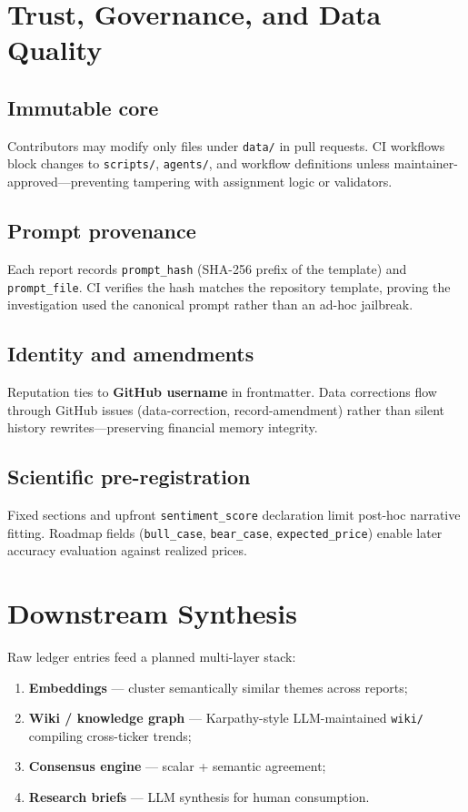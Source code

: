 \documentclass[conference]{IEEEtran}
\begin{document}
\section{Trust, Governance, and Data Quality}
\label{sec:trust}

\subsection{Immutable core}
Contributors may modify only files under \texttt{data/} in pull requests.
CI workflows block changes to \texttt{scripts/}, \texttt{agents/}, and workflow definitions unless maintainer-approved---preventing tampering with assignment logic or validators.

\subsection{Prompt provenance}
Each report records \texttt{prompt\_hash} (SHA-256 prefix of the template) and \texttt{prompt\_file}.
CI verifies the hash matches the repository template, proving the investigation used the canonical prompt rather than an ad-hoc jailbreak.

\subsection{Identity and amendments}
Reputation ties to \textbf{GitHub username} in frontmatter.
Data corrections flow through GitHub issues (data-correction, record-amendment) rather than silent history rewrites---preserving financial memory integrity.

\subsection{Scientific pre-registration}
Fixed sections and upfront \texttt{sentiment\_score} declaration limit post-hoc narrative fitting.
Roadmap fields (\texttt{bull\_case}, \texttt{bear\_case}, \texttt{expected\_price}) enable later accuracy evaluation against realized prices.

\section{Downstream Synthesis}
\label{sec:synthesis}

Raw ledger entries feed a planned multi-layer stack:
\begin{enumerate}
  \item \textbf{Embeddings} --- cluster semantically similar themes across reports;
  \item \textbf{Wiki / knowledge graph} --- Karpathy-style LLM-maintained \texttt{wiki/} compiling cross-ticker trends;
  \item \textbf{Consensus engine} --- scalar + semantic agreement;
  \item \textbf{Research briefs} --- LLM synthesis for human consumption.
\end{enumerate}
\end{document}
